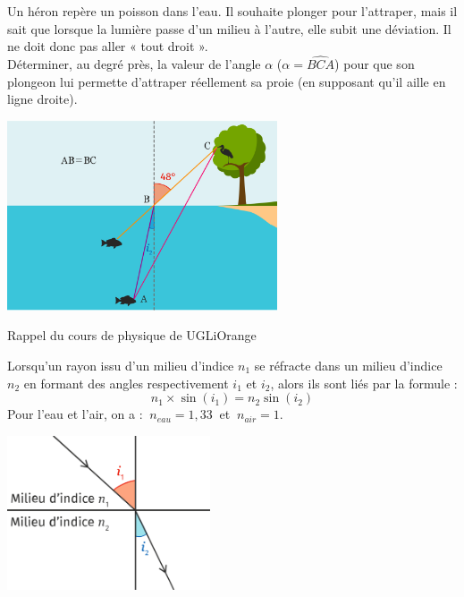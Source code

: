 \documentclass[a4paper,11pt,exos]{nsi} %
\begin{document}
\vspace{.5cm}


\begin{minipage}{8.5cm}
	\exo{}
	Un héron repère un poisson dans l'eau. Il souhaite plonger pour l'attraper, mais il sait que lorsque la lumière passe d'un milieu à l'autre, elle subit une déviation. Il ne doit donc pas aller « tout droit ».\\[1em]
	Déterminer, au degré près, la valeur de l'angle $\alpha$ ($\alpha=\widehat{BCA}$) pour que son plongeon lui permette d'attraper réellement sa proie (en supposant qu'il aille en ligne droite).
\end{minipage}
\begin{minipage}{8.5cm}
	\flushright \includegraphics[width=8cm]{heron}
\end{minipage}

\begin{encadrecolore}{Rappel du cours de physique de \seconde}{UGLiOrange}
	\begin{minipage}{10cm}
		Lorsqu'un rayon issu d'un milieu d'indice $n_1$ se réfracte dans un milieu d'indice $n_2$ en formant des angles respectivement $i_1$ et $i_2$, alors ils sont liés par la formule : $$ n_1\times \sin(i_1)=n_2\sin(i_2)$$
		Pour l'eau et l'air, on a : $\ n_{eau}=1,33\ $ et $\ n_{air}=1$.
	\end{minipage}
\begin{minipage}{6.5cm}
	\flushright \includegraphics[width=6cm]{SnellDescartes}
\end{minipage}
\end{encadrecolore}
\end{document}
